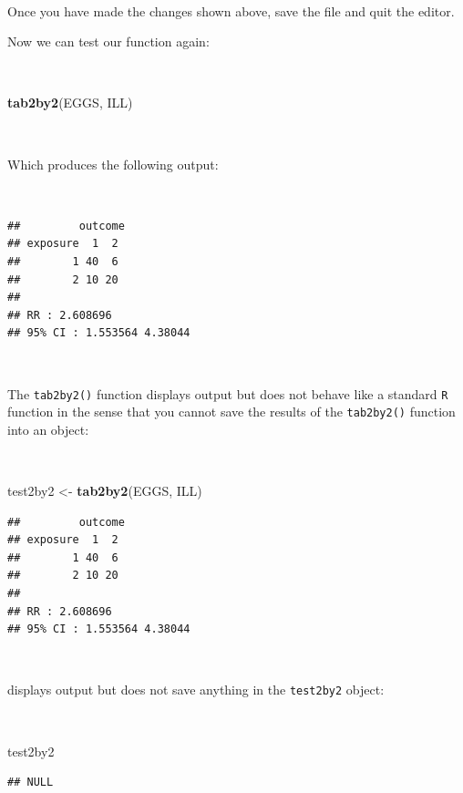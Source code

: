 \documentclass[12pt,a4paper]{book}
\newenvironment{Shaded}{\begin{snugshade}}{\end{snugshade}}
\newcommand{\KeywordTok}[1]{\textcolor[rgb]{0.13,0.29,0.53}{\textbf{#1}}}
\newcommand{\StringTok}[1]{\textcolor[rgb]{0.31,0.60,0.02}{#1}}
\newcommand{\NormalTok}[1]{#1}
\theoremstyle{definition}
\theoremstyle{definition}
\theoremstyle{definition}
\theoremstyle{remark}
\begin{document}
~

Once you have made the changes shown above, save the file and quit the
editor.

\newpage

Now we can test our function again:

~

\begin{Shaded}
\begin{Highlighting}[]
\KeywordTok{tab2by2}\NormalTok{(EGGS, ILL)}
\end{Highlighting}
\end{Shaded}

~

Which produces the following output:

~

\begin{verbatim}
##         outcome
## exposure  1  2
##        1 40  6
##        2 10 20
## 
## RR : 2.608696 
## 95% CI : 1.553564 4.38044
\end{verbatim}

~

The \texttt{tab2by2()} function displays output but does not behave like
a standard \texttt{R} function in the sense that you cannot save the
results of the \texttt{tab2by2()} function into an object:

~

\begin{Shaded}
\begin{Highlighting}[]
\NormalTok{test2by2 <-}\StringTok{ }\KeywordTok{tab2by2}\NormalTok{(EGGS, ILL)}
\end{Highlighting}
\end{Shaded}

\begin{verbatim}
##         outcome
## exposure  1  2
##        1 40  6
##        2 10 20
## 
## RR : 2.608696 
## 95% CI : 1.553564 4.38044
\end{verbatim}

~

displays output but does not save anything in the \texttt{test2by2}
object:

~

\begin{Shaded}
\begin{Highlighting}[]
\NormalTok{test2by2}
\end{Highlighting}
\end{Shaded}

\begin{verbatim}
## NULL
\end{verbatim}
\end{document}

